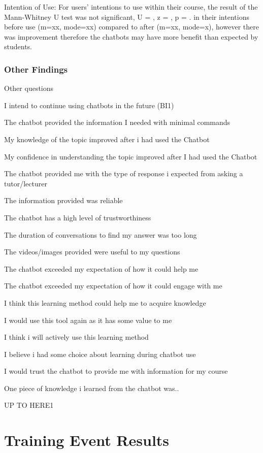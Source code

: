 \documentclass[a4paper, nobind]{templates/ociamthesis}
\begin{document}
Intention of Use: For users' intentions to use within their course, the result of the Mann-Whitney U test was not significant, U = , z = , p = . in their intentions before use (m=xx, mode=xx) compared to after (m=xx, mode=x), however there was improvement therefore the chatbots may have more benefit than expected by students.

\hypertarget{other-findings}{%
\subsection{Other Findings}\label{other-findings}}

Other questions

I intend to continue using chatbots in the future (BI1)

The chatbot provided the information I needed with minimal commands

My knowledge of the topic improved after i had used the Chatbot

My confidence in understanding the topic improved after I had used the Chatbot

The chatbot provided me with the type of response i expected from asking a tutor/lecturer

The information provided was reliable

The chatbot has a high level of trustworthiness

The duration of conversations to find my answer was too long

The videos/images provided were useful to my questions

The chatbot exceeded my expectation of how it could help me

The chatbot exceeded my expectation of how it could engage with me

I think this learning method could help me to acquire knowledge

I would use this tool again as it has some value to me

I think i will actively use this learning method

I believe i had some choice about learning during chatbot use

I would trust the chatbot to provide me with information for my course

One piece of knowledge i learned from the chatbot was..

UP TO HERE1

\hypertarget{cites-and-refs}{%
\chapter{Training Event Results}\label{cites-and-refs}}
\end{document}
